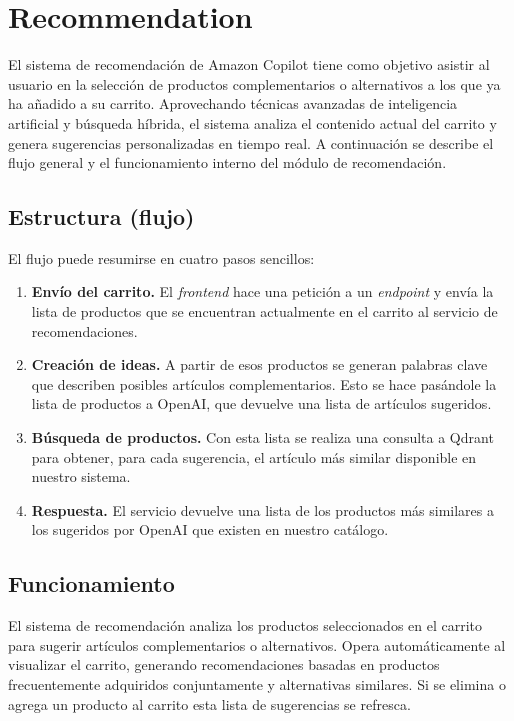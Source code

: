 \section{Recommendation}
El sistema de recomendación de Amazon Copilot tiene como objetivo asistir al usuario en la selección de productos complementarios o alternativos a los que ya ha añadido a su carrito. Aprovechando técnicas avanzadas de inteligencia artificial y búsqueda híbrida, el sistema analiza el contenido actual del carrito y genera sugerencias personalizadas en tiempo real. A continuación se describe el flujo general y el funcionamiento interno del módulo de recomendación.

\subsection{Estructura (flujo)}

El flujo puede resumirse en cuatro pasos sencillos:

\begin{enumerate}
    \item \textbf{Envío del carrito.} El \textit{frontend} hace una petición a un \textit{endpoint} y envía la lista de productos que se encuentran actualmente en el carrito al servicio de recomendaciones.
    \item \textbf{Creación de ideas.} A partir de esos productos se generan palabras clave que describen posibles artículos complementarios. Esto se hace pasándole la lista de productos a OpenAI, que devuelve una lista de artículos sugeridos.
    \item \textbf{Búsqueda de productos.} Con esta lista se realiza una consulta a Qdrant para obtener, para cada sugerencia, el artículo más similar disponible en nuestro sistema.
    \item \textbf{Respuesta.} El servicio devuelve una lista de los productos más similares a los sugeridos por OpenAI que existen en nuestro catálogo.
\end{enumerate}

\subsection{Funcionamiento}

El sistema de recomendación analiza los productos seleccionados en el carrito para sugerir artículos complementarios o alternativos. Opera automáticamente al visualizar el carrito, generando recomendaciones basadas en productos frecuentemente adquiridos conjuntamente y alternativas similares. Si se elimina o agrega un producto al carrito esta lista de sugerencias se refresca.

